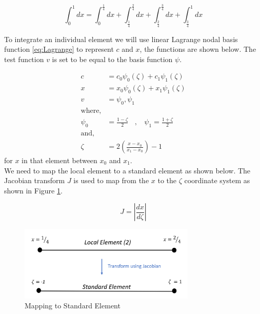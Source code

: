 \documentclass[11pt]{article}
\begin{document}
\begin{equation}
\int_0^1 dx = \int_0^\frac{1}{4}  dx + \int_\frac{1}{4}^\frac{2}{4}  dx + \int_\frac{2}{4}^\frac{3}{4}  dx + \int_\frac{3}{4}^1  dx
\end{equation}

To integrate an individual element we will use linear Lagrange nodal basis function \ref{eq:Lagrange} to represent $c$ and $x$, the functions are shown below. The test function $v$ is set to be equal to the basis function $\psi$.

\begin{subequations}
\label{eq:Lagrange}
\begin{align}
c &= c_{0}\psi_{0}(\zeta) + c_1\psi_{1}(\zeta) \label{eq:LagrangeC} \\
x &= x_{0}\psi_{0}(\zeta) + x_1\psi_{1}(\zeta) \label{eq:LagrangeX} \\
v & = \psi_{0} , \psi_{1} \label{eq:LagrangeV} \\
\text{where,}\\
\psi_{0} &= \frac{1 - \zeta}{2} \ \ \ \ ,  \ \ \ \ \psi_{1} = \frac{1 + \zeta}{2} \label{eq:LagrangePSI}\\
\text{and,}\\
\zeta  & = 2 \left(\frac{x - x_0}{x_1 - x_0}\right) - 1 \label{eq:LagrangeZeta}
\end{align}
\end{subequations}
for $x$ in that element between $x_0$ and $x_1$.\\
We need to map the local element to a standard element as shown below. The Jacobian transform $J$ is used to map from the $x$ to the $\zeta$ coordinate system as shown in Figure \ref{fig:local2standard}.


\begin{equation} \label{eq:Jacobian}
J = \left \vert \frac{dx}{d\zeta}\right \vert
\end{equation}



\begin{figure}[h!]
\centering
\includegraphics[width=0.75\textwidth]{Local2Standard.PNG}
\caption{Mapping to Standard Element}\label{fig:local2standard}
\end{figure}
\end{document}
